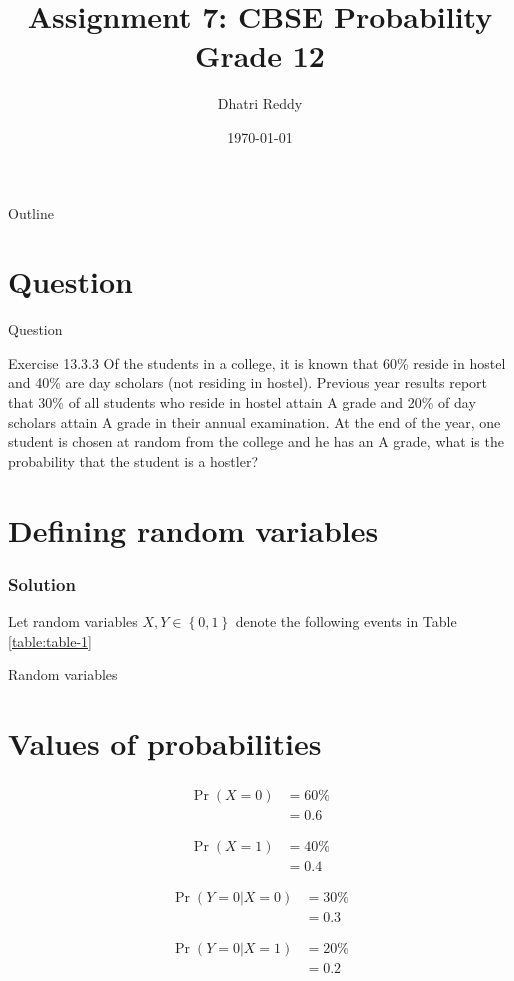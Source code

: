 \documentclass{beamer}
\title{Assignment 7: CBSE Probability Grade 12 }
\author{Dhatri Reddy}
\date{\today}
\providecommand{\pr}[1]{\ensuremath{\Pr\left(#1\right)}}
\providecommand{\cbrak}[1]{\ensuremath{\left\{#1\right\}}}
\begin{document}
\begin{frame}
    \titlepage 
\end{frame}

\logo{}

\begin{frame}{Outline}
    \tableofcontents
\end{frame}

\section{Question}
\begin{frame}{Question}
    \begin{block}{Exercise 13.3.3}
        Of the students in a college, it is known that 60\% reside in hostel and 40\% are day scholars (not residing in hostel). Previous year results report that 30\% of all students who reside in hostel attain A grade and 20\% of day scholars attain A grade in their annual examination. At the end of the year, one student is chosen at random from the college and he has an A grade, what is the probability that the student is a hostler?
    \end{block}
\end{frame}

\section{Defining random variables}
\begin{frame}
\frametitle{Solution}
Let random variables $X, Y \in \cbrak{0,1}$ denote the following events in Table \eqref{table:table-1}
\begin{table}[ht!]
\centering
	
	\vspace*{5pt}
\caption{Random variables}
	\label{table:table-1}
\end{table}
\end{frame}

\section{Values of probabilities}
\begin{frame}
\frametitle{}
\begin{align}
    \pr{X=0} &= 60\% \\
    &= 0.6
\end{align}

\begin{align}
    \pr{X=1} &= 40\% \\
    &= 0.4
\end{align}

\begin{align}
    \pr{Y=0|X=0} &= 30\% \\
    &= 0.3
\end{align}

\begin{align}
    \pr{Y=0|X=1} &= 20\% \\
    &= 0.2
\end{align}
\end{frame}
\end{document}
